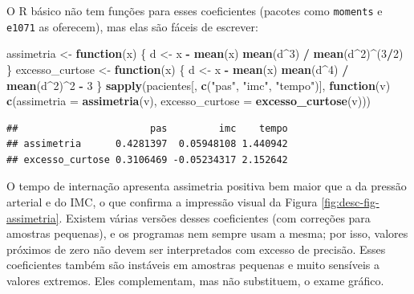 \documentclass[
]{book}
\newenvironment{Shaded}{\begin{snugshade}}{\end{snugshade}}
\newcommand{\AttributeTok}[1]{\textcolor[rgb]{0.13,0.29,0.53}{#1}}
\newcommand{\ControlFlowTok}[1]{\textcolor[rgb]{0.13,0.29,0.53}{\textbf{#1}}}
\newcommand{\DecValTok}[1]{\textcolor[rgb]{0.00,0.00,0.81}{#1}}
\newcommand{\FunctionTok}[1]{\textcolor[rgb]{0.13,0.29,0.53}{\textbf{#1}}}
\newcommand{\NormalTok}[1]{#1}
\newcommand{\OtherTok}[1]{\textcolor[rgb]{0.56,0.35,0.01}{#1}}
\newcommand{\SpecialCharTok}[1]{\textcolor[rgb]{0.81,0.36,0.00}{\textbf{#1}}}
\newcommand{\StringTok}[1]{\textcolor[rgb]{0.31,0.60,0.02}{#1}}
\begin{document}
O R básico não tem funções para esses coeficientes (pacotes como \texttt{moments} e \texttt{e1071} as oferecem), mas elas são fáceis de escrever:

\begin{Shaded}
\begin{Highlighting}[]
\NormalTok{assimetria }\OtherTok{\textless{}{-}} \ControlFlowTok{function}\NormalTok{(x) \{}
\NormalTok{  d }\OtherTok{\textless{}{-}}\NormalTok{ x }\SpecialCharTok{{-}} \FunctionTok{mean}\NormalTok{(x)}
  \FunctionTok{mean}\NormalTok{(d}\SpecialCharTok{\^{}}\DecValTok{3}\NormalTok{) }\SpecialCharTok{/} \FunctionTok{mean}\NormalTok{(d}\SpecialCharTok{\^{}}\DecValTok{2}\NormalTok{)}\SpecialCharTok{\^{}}\NormalTok{(}\DecValTok{3}\SpecialCharTok{/}\DecValTok{2}\NormalTok{)}
\NormalTok{\}}
\NormalTok{excesso\_curtose }\OtherTok{\textless{}{-}} \ControlFlowTok{function}\NormalTok{(x) \{}
\NormalTok{  d }\OtherTok{\textless{}{-}}\NormalTok{ x }\SpecialCharTok{{-}} \FunctionTok{mean}\NormalTok{(x)}
  \FunctionTok{mean}\NormalTok{(d}\SpecialCharTok{\^{}}\DecValTok{4}\NormalTok{) }\SpecialCharTok{/} \FunctionTok{mean}\NormalTok{(d}\SpecialCharTok{\^{}}\DecValTok{2}\NormalTok{)}\SpecialCharTok{\^{}}\DecValTok{2} \SpecialCharTok{{-}} \DecValTok{3}
\NormalTok{\}}
\FunctionTok{sapply}\NormalTok{(pacientes[, }\FunctionTok{c}\NormalTok{(}\StringTok{"pas"}\NormalTok{, }\StringTok{"imc"}\NormalTok{, }\StringTok{"tempo"}\NormalTok{)],}
       \ControlFlowTok{function}\NormalTok{(v) }\FunctionTok{c}\NormalTok{(}\AttributeTok{assimetria =} \FunctionTok{assimetria}\NormalTok{(v), }\AttributeTok{excesso\_curtose =} \FunctionTok{excesso\_curtose}\NormalTok{(v)))}
\end{Highlighting}
\end{Shaded}

\begin{verbatim}
##                       pas         imc    tempo
## assimetria      0.4281397  0.05948108 1.440942
## excesso_curtose 0.3106469 -0.05234317 2.152642
\end{verbatim}

O tempo de internação apresenta assimetria positiva bem maior que a da pressão arterial e do IMC, o que confirma a impressão visual da Figura \ref{fig:desc-fig-assimetria}. Existem várias versões desses coeficientes (com correções para amostras pequenas), e os programas nem sempre usam a mesma; por isso, valores próximos de zero não devem ser interpretados com excesso de precisão. Esses coeficientes também são instáveis em amostras pequenas e muito sensíveis a valores extremos. Eles complementam, mas não substituem, o exame gráfico.
\end{document}
